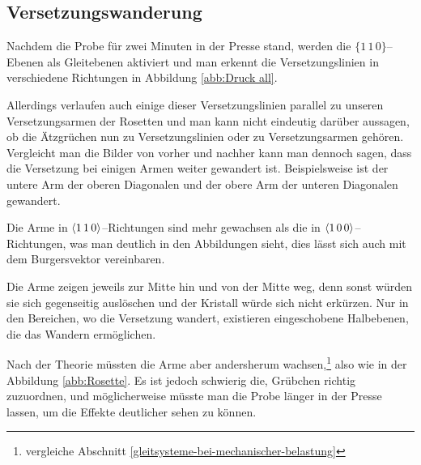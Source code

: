 \documentclass[12pt,a4paper]{scrartcl}
\numberwithin{equation}{section} %
\begin{document}
\hypertarget{versetzungswanderung}{%
\subsection{Versetzungswanderung}\label{versetzungswanderung}}

Nachdem die Probe für zwei Minuten in der Presse stand, werden die $\lbrace1\,1\,0\rbrace$--Ebenen als Gleitebenen aktiviert und man erkennt die Versetzungslinien in verschiedene Richtungen in Abbildung \ref{abb:Druck all}.

Allerdings verlaufen auch einige dieser Versetzungslinien parallel zu unseren Versetzungsarmen der Rosetten und man kann nicht eindeutig darüber aussagen, ob die Ätzgrüchen nun zu Versetzungslinien oder zu Versetzungsarmen gehören. Vergleicht man die Bilder von vorher und nachher kann man dennoch sagen, dass die Versetzung bei einigen Armen weiter gewandert ist. Beispielsweise ist der untere Arm der oberen Diagonalen und der obere Arm der unteren Diagonalen gewandert.

Die Arme in $\expval{1\,1\,0}$--Richtungen sind mehr gewachsen als die in $\expval{1\,0\,0}$--Richtungen, was man deutlich in den Abbildungen sieht, dies lässt sich auch mit dem Burgersvektor vereinbaren.

Die Arme zeigen jeweils zur Mitte hin und von der Mitte weg, denn sonst würden sie sich gegenseitig auslöschen und der Kristall würde sich nicht erkürzen. Nur in den Bereichen, wo die Versetzung wandert, existieren eingeschobene Halbebenen, die das Wandern ermöglichen.

Nach der Theorie müssten die Arme aber andersherum wachsen,\footnote{vergleiche Abschnitt \ref{gleitsysteme-bei-mechanischer-belastung}} also wie in der Abbildung \ref{abb:Rosette}. Es ist jedoch schwierig die, Grübchen richtig zuzuordnen, und möglicherweise müsste man die Probe länger in der Presse lassen, um die Effekte deutlicher sehen zu können.
\end{document}
